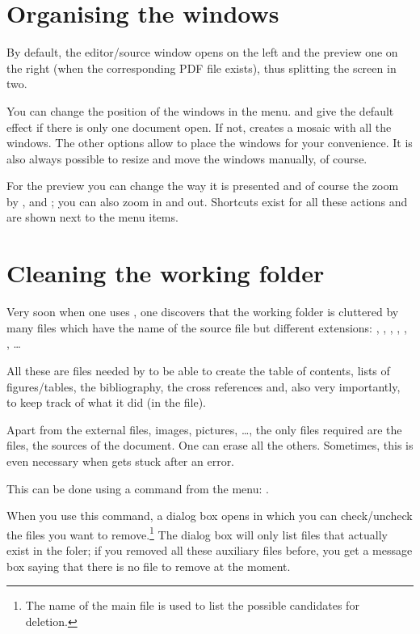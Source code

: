 \section{Organising the windows}

By default, the editor/source window opens on the left and the preview one on the right (when the corresponding PDF file exists), thus splitting the screen in two.

You can change the position of the windows in the  menu. \submenu{} and \submenu{} give the default effect if there is only one document open. If not, \submenu{} creates a mosaic with all the windows. The other options allow to place the windows for your convenience. It is also always possible to resize and move the windows manually, of course.

For the preview you can change the way it is presented and of course the zoom by \submenu{}, \submenu{} and \submenu{}; you can also zoom in and out. Shortcuts exist for all these actions and are shown next to the menu items.

\section{Cleaning the working folder}
\label{sec:remove-aux-files}

Very soon when one uses {\AllTeX}, one discovers that the working folder is cluttered by many files which have the name of the source file but different extensions: , , , , , , \dots

All these are files needed by {\AllTeX} to be able to create the table of contents, lists of figures/tables, the bibliography, the cross references and, also very importantly, to keep track of what it did (in the  file).

Apart from the external files, images, pictures, \dots, the only files required are the  files, the sources of the document. One can erase all the others. Sometimes, this is even necessary when {\AllTeX} gets stuck after an error.

This can be done using a {\Tw} command from the  menu: \submenu{}.

When you use this command, a dialog box opens in which you can check/uncheck the files you want to remove.\footnote{The name of the main file is used to list the possible candidates for deletion.} The dialog box will only list files that actually exist in the foler; if you removed all these auxiliary files before, you get a message box saying that there is no file to remove at the moment.

